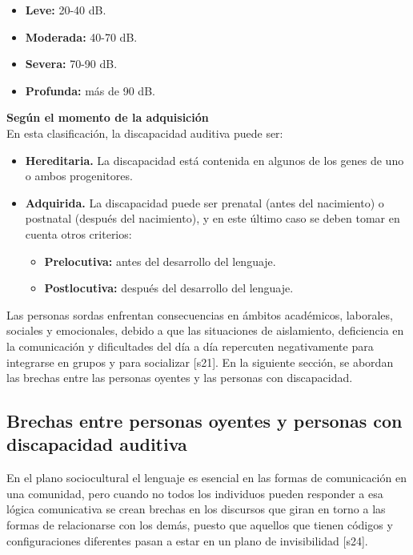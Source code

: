 \begin{itemize}
    \item \textbf{Leve:} 20-40 dB.  
    \item \textbf{Moderada:} 40-70 dB.  
    \item \textbf{Severa:} 70-90 dB.  
    \item \textbf{Profunda:} más de 90 dB.  
\end{itemize}

\textbf{Según el momento de la adquisición}\\
En esta clasificación, la discapacidad auditiva puede ser:

\begin{itemize}
    \item \textbf{Hereditaria.} La discapacidad está contenida en algunos de los genes de uno o ambos progenitores.  
    \item \textbf{Adquirida.} La discapacidad puede ser prenatal (antes del nacimiento) o postnatal (después del nacimiento), y en este último caso se deben tomar en cuenta otros criterios:
        \begin{itemize}
        \item \textbf{Prelocutiva:} antes del desarrollo del lenguaje.  
        \item \textbf{Postlocutiva:} después del desarrollo del lenguaje.  
        \end{itemize}
    \end{itemize}

Las personas sordas enfrentan consecuencias en ámbitos académicos, laborales, sociales y emocionales, debido a que las situaciones de aislamiento, deficiencia en la comunicación y dificultades del día a día repercuten negativamente para integrarse en grupos y para socializar [s21]. En la siguiente sección, se abordan las brechas entre las personas oyentes y las personas con discapacidad.

\subsection{Brechas entre personas oyentes y personas con discapacidad auditiva}
En el plano sociocultural el lenguaje es esencial en las formas de comunicación en una comunidad, pero cuando no todos los individuos pueden responder a esa lógica comunicativa se crean brechas en los discursos que giran en torno a las formas de relacionarse con los demás, puesto que aquellos que tienen códigos y configuraciones diferentes pasan a estar en un plano de invisibilidad [s24].\\

